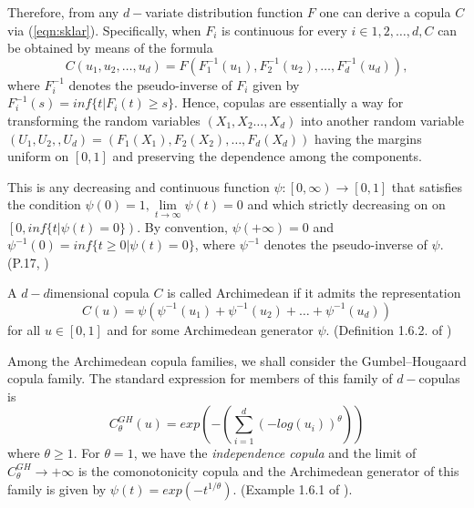 				Therefore, from any $d-$variate distribution function $F$ one can derive a copula $C$ via (\ref{eqn:sklar}). Specifically, when $F_i$ is continuous for every $i \in {1,2, \dots ,d}, C$ can be obtained by means of the formula
					\begin{equation}\label{eqn:invcopula}
						C(u_1,u_2, \dots ,u_d) = F(F^{-1}_1 (u_1),F^{-1}_2 (u_2), \dots,F^{-1}_d (u_d)),
					\end{equation}
				where $F^{-1}_i$ denotes the pseudo-inverse of $F_i$ given by $F^{-1}_i (s) = inf\{t | F_i(t)\ge s\}$.
				Hence, copulas are essentially a way for transforming the random variables $(X_1,X_2 \dots,X_d)$ into another random variable $(U_1,U_2, ,U_d) = (F_1(X_1),F_2(X_2), \dots,F_d(X_d))$ having the margins uniform on $[0,1]$ and preserving the dependence among the components. \cite{jaworski2010copula}

				\begin{defn}
					This is any decreasing and continuous function $\psi : \left[0,\infty\right) \rightarrow [0,1]$ that satisfies the condition $\psi(0)=1, \lim\limits_{t \rightarrow \infty}\psi(t) =0$ and which strictly decreasing on on $\left[ 0, inf\{t | \psi(t)=0\}\right)$. By convention, $\psi(+\infty) = 0$ and $\psi^{-1}(0) = inf\{t \ge 0 | \psi(t) = 0\}$, where $\psi^{-1}$ denotes the pseudo-inverse of $\psi$.(P.17, \cite{jaworski2010copula})
				\end{defn}

				\begin{defn}
					A $d-d$imensional copula $C$ is called Archimedean if it admits the representation
					\begin{equation}\label{eqn:archmediancop}
						C(u) =\psi (\psi^{-1}(u_1) +\psi^{-1}(u_2)+ \dots + \psi^{-1}(u_d))
					\end{equation}
					for all $u \in [0,1]$ and for some Archimedean generator $\psi$. (Definition 1.6.2. of \cite{jaworski2010copula})
				\end{defn}

				Among the Archimedean copula families, we shall consider the Gumbel–Hougaard copula family. The standard expression for members of this family of $d-$copulas is
				\begin{equation}\label{eqn:gumbelHougaard}
					C^{GH}_{\theta}(u) = exp\left(-\left(\sum_{i=1}^{d} (-log(u_i))^{\theta}\right)\right)
				\end{equation}
				where $\theta \ge1$. For $\theta = 1$, we have the \textit{independence copula} and the limit of $C^{GH}_{\theta} \rightarrow +\infty$ is the comonotonicity copula and the Archimedean generator of this family is given by $\psi(t) = exp\left(-t^{1/{\theta}}\right)$. (Example 1.6.1 of \cite{jaworski2010copula}).



